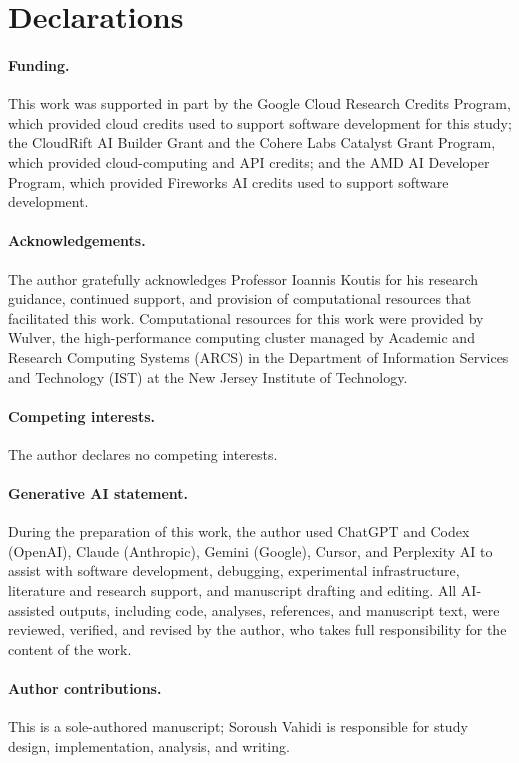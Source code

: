 \section*{Declarations}

\paragraph{Funding.}
This work was supported in part by the Google Cloud Research Credits
Program, which provided cloud credits used to support software development
for this study; the CloudRift AI Builder Grant and the Cohere Labs Catalyst
Grant Program, which provided cloud-computing and API credits; and the AMD AI
Developer Program, which provided Fireworks AI credits used to support software
development.

\paragraph{Acknowledgements.} The author gratefully acknowledges Professor
Ioannis Koutis for his research guidance, continued support, and provision
of computational resources that facilitated this work. Computational
resources for this work were provided by Wulver, the high-performance
computing cluster managed by Academic and Research Computing Systems
(ARCS) in the Department of Information Services and Technology (IST) at
the New Jersey Institute of Technology.

\paragraph{Competing interests.} The author declares no competing
interests.

\paragraph{Generative AI statement.} During the preparation of this work,
the author used ChatGPT and Codex (OpenAI), Claude (Anthropic), Gemini
(Google), Cursor, and Perplexity AI to assist with software development,
debugging, experimental infrastructure, literature and research support,
and manuscript drafting and editing. All AI-assisted outputs, including
code, analyses, references, and manuscript text, were reviewed, verified,
and revised by the author, who takes full responsibility for the content
of the work.

\paragraph{Author contributions.} This is a sole-authored manuscript;
Soroush Vahidi is responsible for study design, implementation, analysis,
and writing.


